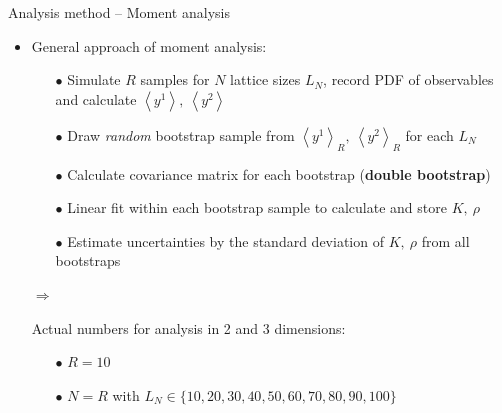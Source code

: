 \documentclass[xcolor=dvipsnames]{beamer}
\newcommand{\myitemsep}{\setlength\itemsep{0.33cm}}
\newcommand{\mysubitemsep}{\setlength\itemsep{0.22cm}}
\begin{document}
	\begin{frame}{Analysis method -- Moment analysis}
		\begin{itemize}
			\myitemsep
			\item {General approach of moment analysis:
				\begin{itemize}
					\mysubitemsep
					\item[$\bullet$] Simulate $R$ samples for $N$ lattice sizes $L_N$, record PDF of observables and calculate $\left\langle y^1 \right\rangle,\ \left\langle y^2 \right\rangle$
					\item[$\bullet$] Draw \textit{random} bootstrap sample from $\left\langle y^1 \right\rangle_R,\ \left\langle y^2 \right\rangle_R$ for each $L_N$
					\item[$\bullet$] Calculate covariance matrix for each bootstrap (\textbf{double bootstrap})
					\item[$\bullet$] Linear fit within each bootstrap sample to calculate and store $K,\ \rho$
					\item[$\bullet$] Estimate uncertainties by the standard deviation of $K,\ \rho$ from all bootstraps
				\end{itemize}
			}
			\item[$\Rightarrow$] {Actual numbers for analysis in 2 and 3 dimensions:
				\begin{itemize}
					\mysubitemsep
					\item[$\bullet$] $R = 10$
					\item[$\bullet$] $N = R$ with $L_N \in \{10, 20, 30, 40, 50, 60, 70, 80, 90, 100\}$
				\end{itemize}
			}
		\end{itemize}
	\end{frame}
	
\end{document}
